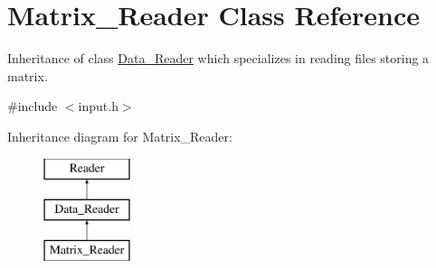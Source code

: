 \hypertarget{class_matrix___reader}{}\section{Matrix\+\_\+\+Reader Class Reference}
\label{class_matrix___reader}


Inheritance of class \mbox{\hyperlink{class_data___reader}{Data\+\_\+\+Reader}} which specializes in reading files storing a matrix.  




{\ttfamily \#include $<$input.\+h$>$}

Inheritance diagram for Matrix\+\_\+\+Reader\+:\begin{figure}[H]
\begin{center}
\leavevmode
\includegraphics[height=3.000000cm]{class_matrix___reader}
\end{center}
\end{figure}
